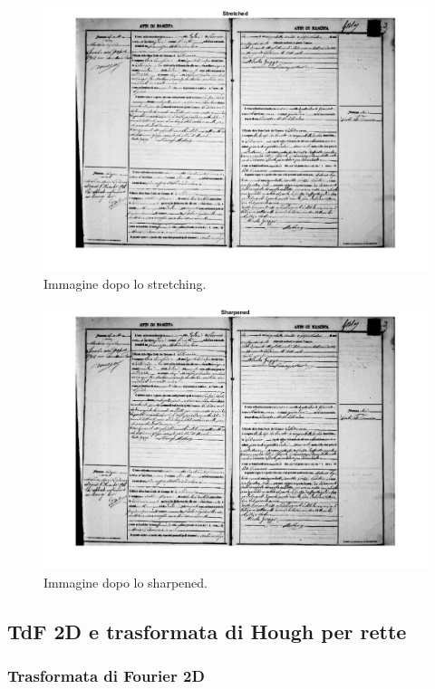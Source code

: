 \documentclass[a4paper]{article}
\begin{document}
	\begin{figure}[!htp]
		\centering
		\includegraphics[width=\textwidth]{img/lab/operato-locali-14.jpg}
		\caption{Immagine dopo lo stretching.}
	\end{figure}
	\begin{figure}[!htp]
		\centering
		\includegraphics[width=\textwidth]{img/lab/operato-locali-15.jpg}
		\caption{Immagine dopo lo sharpened.}
	\end{figure}\newpage
	
	\subsection{TdF 2D e trasformata di Hough per rette}
	
	\subsubsection{Trasformata di Fourier 2D}
	
\end{document}
